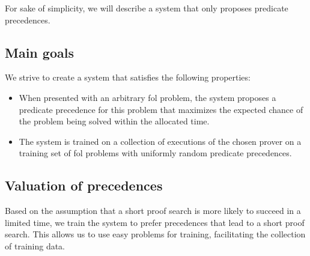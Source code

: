 For sake of simplicity,
we will describe a system that only proposes predicate precedences.

\subsection{Main goals}

We strive to create a system that satisfies the following properties:

\begin{itemize}
	\item When presented with an arbitrary \gls{fol} problem,
	the system proposes a predicate precedence for this problem
	that maximizes the expected chance of the problem being solved
	within the allocated time.
	
	
	\item The system is trained on a collection of executions of the chosen prover
	on a training set of \gls{fol} problems
	with uniformly random predicate precedences.
\end{itemize}


\subsection{Valuation of precedences}

Based on the assumption that a short proof search is more likely to succeed in a limited time\cite{?},
we train the system to prefer precedences that lead to a short proof search.
This allows us to use easy problems for training, facilitating the collection of training data.


